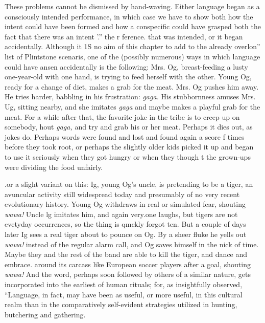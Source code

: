 
These problems cannot be dismissed by hand-waving. Either language began as a consciously intended performance, in which case we have to show both how the intent could have been formed and how a conspecific could have grasped both the fact that there was an intent '.{\textquotedbl}'' the r ference. that was intended, or it began accidentally. Although it 1S no aim of this chapter to add to the already overlon'' list of Plint\-stone scenaris, one of the (possibly numerous) ways in which language could have ansen accidentally is the following: Mrs. Og, breast-feeding a lusty one-year-old with one hand, is trying to feed herself with the other. Young Og, ready for a change of diet, makes a grab for the meat. Mrs. Og pushes him away. He tries harder, babbling in his frustra\-tion: \textit{gaga.} His stubbornness amuses Mrs. Ug, sitting nearby, and she imitates \textit{gaga} and maybe makes a playful grab for the meat. For a while after that, the favorite joke in the tribe is to creep up on somebody, hout \textit{gaga, }and try and grab his or her meat. Perhaps it dies out, as jokes do. Perhaps words were found and lost and found again a score f times before they took root, or perhaps the slightly older kids picked
it up and began to use it seriously when they got hungry or when they though t the grown-ups were dividing the food unfairly.

.or a slight variant on this: Ig, young Og's uncle, is pretending to be a tiger, an avuncular activity still widespread today and presumably of no very recent evolutionary history. Young Og withdraws in real or simulated fear, shouting \textit{wawa!} Uncle lg imitates him, and again very.one laughs, but tigers are not evetyday occurrences, so the thing is qmckly forgot ten. But a couple of days later Ig sees a real tiger about to pounce on Og. By a sheer fluke he yells out \textit{wawa!} instead of the regular alarm call, and Og saves himself in the nick of time. Maybe they and the rest of the band are able to kill the tiger, and dance and em\-brace. around its carcass like European soccer players after a goal, shouting \textit{wawa! }And the word, perhaps soon followed by others of a
similar nature, gets incorporated into the earliest of human rituals; for, as \citet{Marshack1976} insightfully observed, ``Language, in fact, may have been as useful, or more useful, in this cultural realm than in the
comparatively self-evident strategies utilized in hunting, butchering and gathering.{\textquotedbl}

